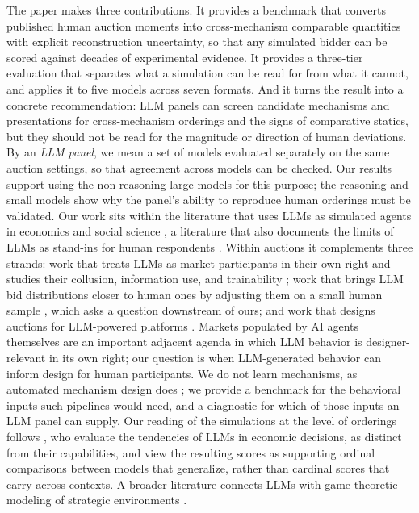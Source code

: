 \documentclass[acmsmall,screen,review]{acmart}
\newcommand{\rev}[1]{{\color{blue}#1}}
\newcommand{\rev}[1]{#1}
\begin{document}
The paper makes three contributions.
It provides a benchmark that converts published human auction moments into cross-mechanism comparable quantities with explicit reconstruction uncertainty, so that any simulated bidder can be scored against decades of experimental evidence.
It provides a three-tier evaluation that separates what a simulation can be read for from what it cannot, and applies it to five models across seven formats.
And it turns the result into a concrete recommendation: LLM panels can screen candidate mechanisms and presentations for cross-mechanism orderings and the signs of comparative statics, but they should not be read for the magnitude or direction of human deviations. By an \emph{LLM panel}, we mean a set of models evaluated separately on the same auction settings, so that agreement across models can be checked. Our results support using the non-reasoning large models for this purpose; the reasoning and small models show why the panel's ability to reproduce human orderings must be validated.
Our work sits within the literature that uses LLMs as simulated agents in economics and social science \citep{aher2023using, park2023generative, horton2023large, manning2024automated}, a literature that also documents the limits of LLMs as stand-ins for human respondents \rev{\citep{santurkar2023whose, wang2025large}}.
Within auctions it complements three strands: work that treats LLMs as market participants in their own right and studies their collusion, information use, and trainability \citep{fish2024algorithmic, chen2023put, infobid2025, lu2025claude, tsuchihashi2023homo, auctionnet2024}; work that brings LLM bid distributions closer to human ones by adjusting them on a small human sample \citep{corrigan2025usefulness}, which asks a question downstream of ours; and work that designs auctions for LLM-powered platforms \citep{duetting2024mechanism, ramage2024adauctions}.
Markets populated by AI agents themselves are an important adjacent agenda in which LLM behavior is designer-relevant in its own right; our question is when LLM-generated behavior can inform design for human participants.
We do not learn mechanisms, as automated mechanism design does \citep{dutting2024optimal, curry102automated, wang2024gemnet, feng2018deep, wang2025bundleflow, ravindranath2023data}; we provide a benchmark for the behavioral inputs such pipelines would need, and a diagnostic for which of those inputs an LLM panel can supply.
\rev{Our reading of the simulations at the level of orderings follows \citet{fish2025econevals}, who evaluate the tendencies of LLMs in economic decisions, as distinct from their capabilities, and view the resulting scores as supporting ordinal comparisons between models that generalize, rather than cardinal scores that carry across contexts.}
A broader literature connects LLMs with game-theoretic modeling of strategic environments \citep{daskalakis2024charting, huang2025accelerated, soumalias2025llm, jiang2025incentive, wang2026llm}.
\end{document}
